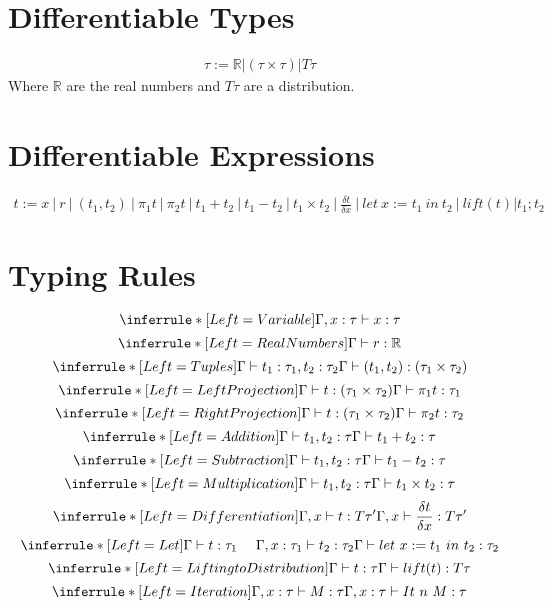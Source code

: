\documentclass{article}
\begin{document}
    \section{Differentiable Types}
    \begin{align*}
        \tau := \mathbb{R}|(\tau \times \tau)|T\tau
    \end{align*}
    Where $\mathbb{R}$ are the real numbers and $T\tau$ are a distribution. 
    \section{Differentiable Expressions}
        \begin{align*}
            t := x\ |\ r\ |\ (t_1, t_2)\ |\ \pi_1 t\ |\ \pi_2 t\ |\ t_1 + t_2\ |\ t_1 - t_2\ |\ t_1 \times t_2\ |\ \frac{\delta t}{\delta x}\ |\ let\ x:= t_1\ in\ t_2\ |\ lift(t)|t_1;t_2
        \end{align*}
    \section{Typing Rules}
        \begin{center}
            $$\inferrule*[Left=Variable]{ }{\Gamma, x:\tau \vdash x:\tau}$$
            $$\inferrule*[Left=Real Numbers]{ }{\Gamma \vdash r:\mathbb{R}}$$
            $$\inferrule*[Left=Tuples]{\Gamma \vdash t_1:\tau_1, t_2:\tau_2}{\Gamma \vdash (t_1, t_2):(\tau_1 \times \tau_2)}$$
            $$\inferrule*[Left=Left Projection]{\Gamma \vdash t:(\tau_1 \times \tau_2)}{\Gamma \vdash \pi_1t:\tau_1}$$
            $$\inferrule*[Left=Right Projection]{\Gamma \vdash t:(\tau_1 \times \tau_2)}{\Gamma \vdash \pi_2t:\tau_2}$$
            $$\inferrule*[Left=Addition]{\Gamma \vdash t_1, t_2:\tau}{\Gamma \vdash t_1 + t_2:\tau}$$
            $$\inferrule*[Left=Subtraction]{\Gamma \vdash t_1, t_2:\tau}{\Gamma \vdash t_1 - t_2:\tau}$$
            $$\inferrule*[Left=Multiplication]{\Gamma \vdash t_1, t_2:\tau}{\Gamma \vdash t_1 \times t_2:\tau}$$
            $$\inferrule*[Left=Differentiation]{\Gamma, x \vdash t:T\tau '}{\Gamma, x \vdash \frac{\delta t}{\delta x}:T\tau'}$$
            $$\inferrule*[Left=Let]{\Gamma \vdash t:\tau_1\ \ \ \ \Gamma, x:\tau_1 \vdash t_2:\tau_2}{\Gamma \vdash let\ x := t_1\ in\ t_2:\tau_2}$$
            $$\inferrule*[Left=Lifting to Distribution]{\Gamma \vdash t:\tau}{\Gamma \vdash lift(t):T\tau}$$
            $$\inferrule*[Left=Iteration]{\Gamma, x:\tau \vdash M:\tau}{\Gamma, x:\tau \vdash It\ n\ M:\tau}$$
        \end{center}
\end{document}
